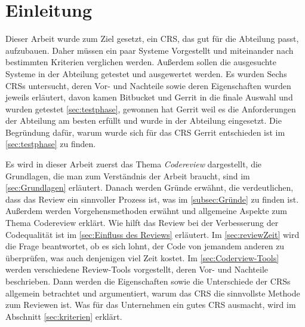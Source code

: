 \newpage

\section{Einleitung}
\label{sec:Einleitung}

Dieser Arbeit wurde zum Ziel gesetzt, ein \ac{CRS}, das gut für die Abteilung passt, aufzubauen. Daher müssen ein paar Systeme Vorgestellt und miteinander nach bestimmten Kriterien verglichen werden. Außerdem sollen die ausgesuchte Systeme in der Abteilung getestet und ausgewertet werden.
Es wurden Sechs \acp{CRS} untersucht, deren Vor- und Nachteile sowie deren Eigenschaften wurden jeweils erläutert, davon kamen Bitbucket und Gerrit in die finale Auswahl und wurden getestet \cref{sec:testphase}, gewonnen hat Gerrit weil es die Anforderungen der Abteilung am besten erfüllt und wurde in der Abteilung eingesetzt. Die Begründung dafür, warum wurde sich für das \ac{CRS} Gerrit entschieden ist im \cref{sec:testphase} zu finden.

Es wird in dieser Arbeit zuerst das Thema \emph{Codereview} dargestellt, die Grundlagen, die man zum Verständnis der Arbeit braucht, sind im \cref{sec:Grundlagen} erläutert. Danach werden Gründe erwähnt, die verdeutlichen, dass das Review ein sinnvoller Prozess ist, was im \cref{subsec:Gründe} zu finden ist. Außerdem werden Vorgehensmethoden erwähnt und allgemeine Aspekte zum Thema Codereview erklärt. Wie hilft das Review bei der Verbesserung der Codequalität ist im \cref{sec:Einfluss des Reviews} erläutert. Im \cref{sec:reviewZeit} wird die Frage beantwortet, ob es sich lohnt, der Code von jemandem anderen zu überprüfen, was auch denjenigen viel Zeit kostet.
Im \cref{sec:Coderview-Tools} werden verschiedene Review-Tools vorgestellt, deren Vor- und Nachteile beschrieben. Dann werden die Eigenschaften sowie die Unterschiede der \acp{CRS} allgemein betrachtet und argumentiert, warum das \ac{CRS} die sinnvollste Methode zum Reviewen ist. Was für das Unternehmen ein gutes \ac{CRS} ausmacht, wird im Abschnitt \ref{sec:kriterien} erklärt.